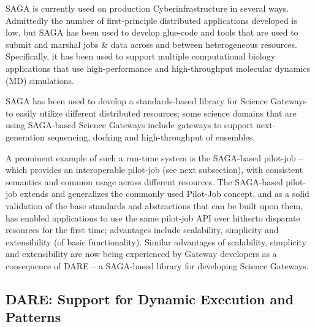 \documentclass[]{svjour3}
\begin{document}
SAGA is currently used on production Cyberinfrastructure in several ways.
Admittedly the number of first-principle distributed applications developed is
low, but SAGA has been used to develop glue-code and tools that are
used to submit and marshal jobs \& data across and between
heterogeneous resources. Specifically, it has been used to support
multiple computational biology applications that use high-performance
and high-throughput molecular dynamics (MD) simulations.

  SAGA
has been used to develop a standards-based library for Science
Gateways to easily utilize different distributed resources; some
science domains that are using SAGA-based Science Gateways include
gateways to support next-generation sequencing, docking and
high-throughput of ensembles.


  A prominent example of
such a run-time system is the SAGA-based pilot-job – which provides an
interoperable pilot-job (see next subsection), with consistent
semantics and common usage across different resources. The SAGA-based
pilot-job extends and generalizes the commonly used Pilot-Job concept,
and as a solid validation of the base standards and abstractions that
can be built upon them, has enabled applications to use the same
pilot-job API over hitherto disparate resources for the first time;
advantages include scalability, simplicity and extensibility (of basic
functionality). Similar advantages of scalability, simplicity and
extensibility are now being experienced by Gateway developers as a
consequence of DARE – a SAGA-based library for developing Science
Gateways.


\subsection{DARE: Support for Dynamic Execution and Patterns}
\end{document}
